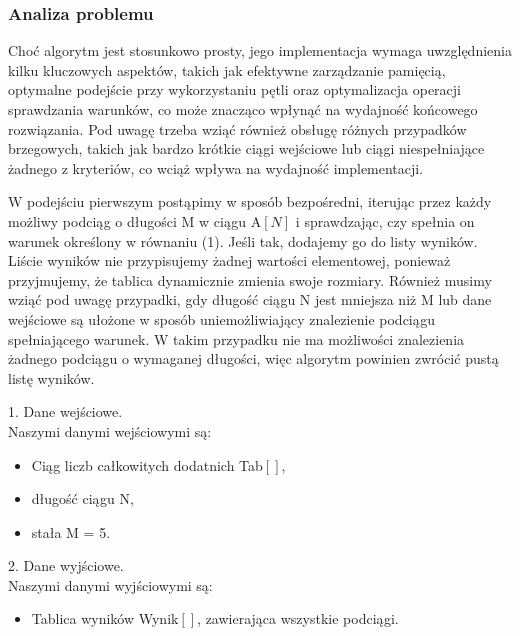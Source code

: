 \documentclass[12pt]{article}
\begin{document}
\subsubsection{Analiza problemu}

Choć algorytm jest stosunkowo prosty, jego implementacja wymaga uwzględnienia kilku kluczowych aspektów, takich jak efektywne zarządzanie pamięcią, optymalne podejście przy wykorzystaniu pętli oraz optymalizacja operacji sprawdzania warunków, co może znacząco wpłynąć na wydajność końcowego rozwiązania. Pod uwagę trzeba wziąć również obsługę różnych przypadków brzegowych, takich jak bardzo krótkie ciągi wejściowe lub ciągi niespełniające żadnego z kryteriów, co wciąż wpływa na wydajność implementacji.

\vspace{0.2cm}
W podejściu pierwszym postąpimy w sposób bezpośredni, iterując przez każdy możliwy podciąg o długości M w ciągu A$[N]$ i sprawdzając, czy spełnia on warunek określony w równaniu (1). Jeśli tak, dodajemy go do listy wyników. Liście wyników nie przypisujemy żadnej wartości elementowej, ponieważ przyjmujemy, że tablica dynamicznie zmienia swoje rozmiary.
Również musimy wziąć pod uwagę przypadki, gdy długość ciągu N jest mniejsza niż M lub dane wejściowe są ułożone w sposób uniemożliwiający znalezienie podciągu spełniającego warunek. W takim przypadku nie ma możliwości znalezienia żadnego podciągu o wymaganej długości, więc algorytm powinien zwrócić pustą listę wyników.

\vspace{0.4cm}
1. Dane wejściowe.\\
\hspace*{1cm} Naszymi danymi wejściowymi są: 
\begin{itemize}
	\setlength{\leftskip}{1cm}
	\item Ciąg liczb całkowitych dodatnich Tab$[]$,
	\item długość ciągu N,
	\item stała M = 5.
\end{itemize}

	2. Dane wyjściowe.\\
\hspace*{1cm} Naszymi danymi wyjściowymi są: 
\begin{itemize}
	\setlength{\leftskip}{1cm}
	\item Tablica wyników Wynik$[]$, zawierająca wszystkie podciągi.
\end{itemize}

\vspace{0.4cm}
\end{document}
